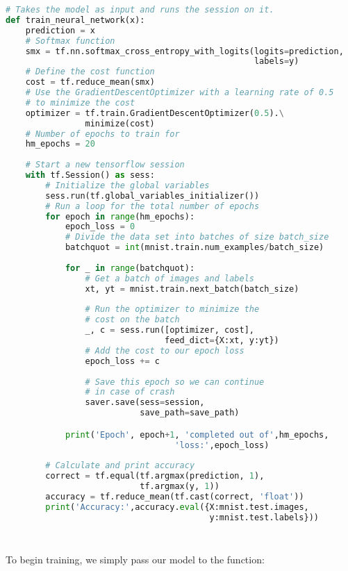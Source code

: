 \documentclass[Proceedings]{ascelike}
\begin{document}
\begin{lstlisting}[language=Python]
# Takes the model as input and runs the session on it.
def train_neural_network(x):
    prediction = x
    # Softmax function
    smx = tf.nn.softmax_cross_entropy_with_logits(logits=prediction,
                                                  labels=y)
    # Define the cost function
    cost = tf.reduce_mean(smx)
    # Use the GradientDescentOptimizer with a learning rate of 0.5 
    # to minimize the cost
    optimizer = tf.train.GradientDescentOptimizer(0.5).\
                minimize(cost)
    # Number of epochs to train for
    hm_epochs = 20
    
    # Start a new tensorflow session
    with tf.Session() as sess:
        # Initialize the global variables
        sess.run(tf.global_variables_initializer())
        # Run a loop for the total number of epochs
        for epoch in range(hm_epochs):
            epoch_loss = 0
            # Divide the data set into batches of size batch_size
            batchquot = int(mnist.train.num_examples/batch_size)
            
            for _ in range(batchquot):
                # Get a batch of images and labels
                xt, yt = mnist.train.next_batch(batch_size)
                
                # Run the optimizer to minimize the 
                # cost on the batch
                _, c = sess.run([optimizer, cost], 
                                feed_dict={X:xt, y:yt})
                # Add the cost to our epoch loss
                epoch_loss += c
                
                # Save this epoch so we can continue
                # in case of crash
                saver.save(sess=session,
                           save_path=save_path)

            print('Epoch', epoch+1, 'completed out of',hm_epochs,
                                  'loss:',epoch_loss)
        
        # Calculate and print accuracy
        correct = tf.equal(tf.argmax(prediction, 1), 
                           tf.argmax(y, 1))
        accuracy = tf.reduce_mean(tf.cast(correct, 'float'))
        print('Accuracy:',accuracy.eval({X:mnist.test.images, 
                                         y:mnist.test.labels}))
        
        
\end{lstlisting}

To begin training, we simply pass our model to the function:
\end{document}
